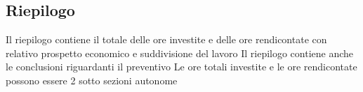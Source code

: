 \subsection{Riepilogo}
Il riepilogo contiene il totale delle ore investite e delle ore rendicontate con relativo prospetto economico e suddivisione del lavoro
Il riepilogo contiene anche le conclusioni riguardanti il preventivo
Le ore totali investite e le ore rendicontate possono essere 2 sotto sezioni
autonome
